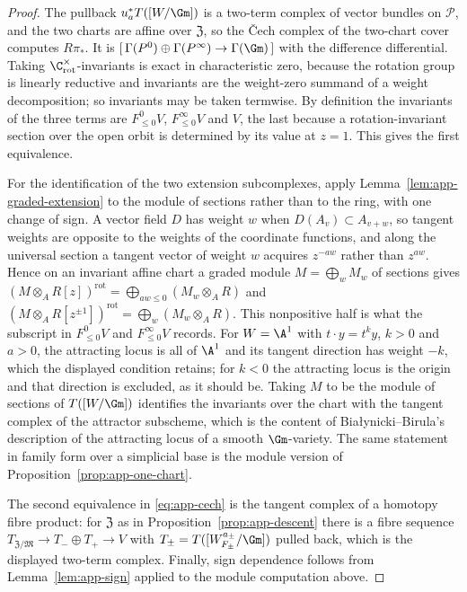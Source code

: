 \begin{proof}
The pullback \(u_a^*T([W/\Gm])\) is a two-term complex of vector bundles on
\(\mathcal P\), and the two charts are affine over \(\mathfrak Z\), so the
\v{C}ech complex of the two-chart cover computes \(R\pi_*\).  It is
\([\,\Gamma(P^0)\oplus\Gamma(P^\infty)\to\Gamma(\Gm)\,]\) with the difference
differential.  Taking \(\C^\times_{\mathrm{rot}}\)-invariants is exact in
characteristic zero, because the rotation group is linearly reductive and
invariants are the weight-zero summand of a weight decomposition; so invariants
may be taken termwise.  By definition the invariants of the three terms are
\(F^0_{\leq0}V\), \(F^\infty_{\leq0}V\) and \(V\), the last because a
rotation-invariant section over the open orbit is determined by its value at
\(z=1\).  This gives the first equivalence.

For the identification of the two extension subcomplexes, apply
Lemma~\ref{lem:app-graded-extension} to the module of sections rather than to
the ring, with one change of sign.  A vector field \(D\) has weight \(w\) when
\(D(A_v)\subset A_{v+w}\), so tangent weights are opposite to the weights of
the coordinate functions, and along the universal section a tangent vector of
weight \(w\) acquires \(z^{-aw}\) rather than \(z^{aw}\).  Hence on an
invariant affine chart a graded module \(M=\bigoplus_wM_w\) of sections gives
\((M\otimes_AR[z])^{\mathrm{rot}}=\bigoplus_{aw\leq0}(M_w\otimes_AR)\) and
\((M\otimes_AR[z^{\pm1}])^{\mathrm{rot}}=\bigoplus_w(M_w\otimes_AR)\).  This
nonpositive half is what the subscript in \(F^0_{\leq0}V\) and
\(F^\infty_{\leq0}V\) records.  For \(W=\A^1\) with \(t\cdot y=t^ky\), \(k>0\) and
\(a>0\), the attracting locus is all of \(\A^1\) and its tangent direction has
weight \(-k\), which the displayed condition retains; for \(k<0\) the
attracting locus is the origin and that direction is excluded, as it should
be.  Taking
\(M\) to be the module of sections of \(T([W/\Gm])\) identifies the invariants
over the chart with the tangent complex of the attractor subscheme, which is
the content of Bia{\l}ynicki--Birula's description of the attracting locus of a
smooth \(\Gm\)-variety.  The same statement in family form over a simplicial
base is the module version of Proposition~\ref{prop:app-one-chart}.

The second equivalence in \eqref{eq:app-cech} is the tangent complex of a
homotopy fibre product: for \(\mathfrak Z\) as in
Proposition~\ref{prop:app-descent} there is a fibre sequence
\(T_{\mathfrak Z/\mathfrak M}\to T_{-}\oplus T_{+}\to V\) with
\(T_\pm=T([W_{F_\pm}^{a_\pm}/\Gm])\) pulled back, which is the displayed
two-term complex.  Finally, sign dependence follows from
Lemma~\ref{lem:app-sign} applied to the module computation above.
\end{proof}


